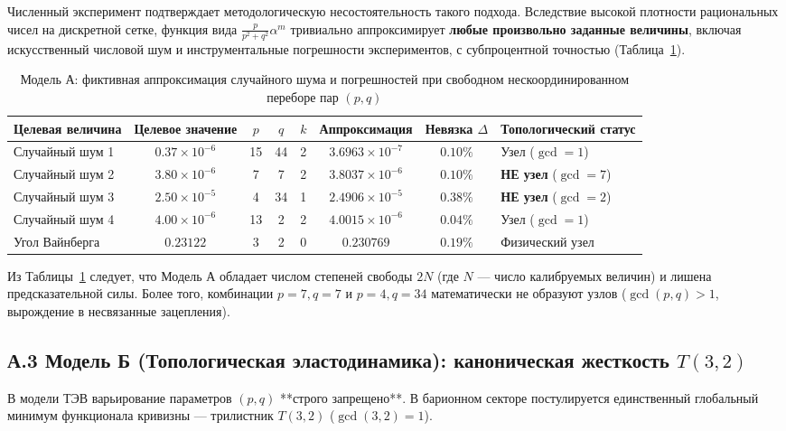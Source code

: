 \documentclass[11pt,a4paper]{article}
\theoremstyle{definition}
\theoremstyle{remark}
\begin{document}
Численный эксперимент подтверждает методологическую несостоятельность такого подхода. Вследствие высокой плотности рациональных чисел на дискретной сетке, функция вида $\frac{p}{p^2 + q^2} \alpha^m$ тривиально аппроксимирует \textbf{любые произвольно заданные величины}, включая искусственный числовой шум и инструментальные погрешности экспериментов, с субпроцентной точностью (Таблица~\ref{tab:model_a_numerology}).

\begin{table}[H]
\centering
\small
\caption{Модель А: фиктивная аппроксимация случайного шума и погрешностей при свободном нескоординированном переборе пар $(p, q)$}
\label{tab:model_a_numerology}
\vspace{2mm}
\begin{tabular}{lccccccl}
\toprule
\textbf{Целевая величина} & \textbf{Целевое значение} & $p$ & $q$ & $k$ & \textbf{Аппроксимация} & \textbf{Невязка $\Delta$} & \textbf{Топологический статус} \\
\midrule
Случайный шум 1 & $0.37 \times 10^{-6}$ & 15 & 44 & 2 & $3.6963 \times 10^{-7}$ & $0.10\%$ & Узел ($\gcd=1$) \\
Случайный шум 2 & $3.80 \times 10^{-6}$ & 7 & 7 & 2 & $3.8037 \times 10^{-6}$ & $0.10\%$ & \textbf{НЕ узел} ($\gcd=7$) \\
Случайный шум 3 & $2.50 \times 10^{-5}$ & 4 & 34 & 1 & $2.4906 \times 10^{-5}$ & $0.38\%$ & \textbf{НЕ узел} ($\gcd=2$) \\
Случайный шум 4 & $4.00 \times 10^{-6}$ & 13 & 2 & 2 & $4.0015 \times 10^{-6}$ & $0.04\%$ & Узел ($\gcd=1$) \\
\midrule
Угол Вайнберга & $0.23122$ & 3 & 2 & 0 & $0.230769$ & $0.19\%$ & Физический узел \\
\bottomrule
\end{tabular}
\end{table}

\noindent Из Таблицы~\ref{tab:model_a_numerology} следует, что Модель А обладает числом степеней свободы $2N$ (где $N$ --- число калибруемых величин) и лишена предсказательной силы. Более того, комбинации $p=7, q=7$ и $p=4, q=34$ математически не образуют узлов ($\gcd(p,q) > 1$, вырождение в несвязанные зацепления).

\subsection*{А.3 Модель Б (Топологическая эластодинамика): каноническая жесткость $T(3,2)$}
В модели ТЭВ варьирование параметров $(p, q)$ **строго запрещено**. В барионном секторе постулируется единственный глобальный минимум функционала кривизны --- трилистник $T(3,2)$ ($\gcd(3,2)=1$).
\end{document}
